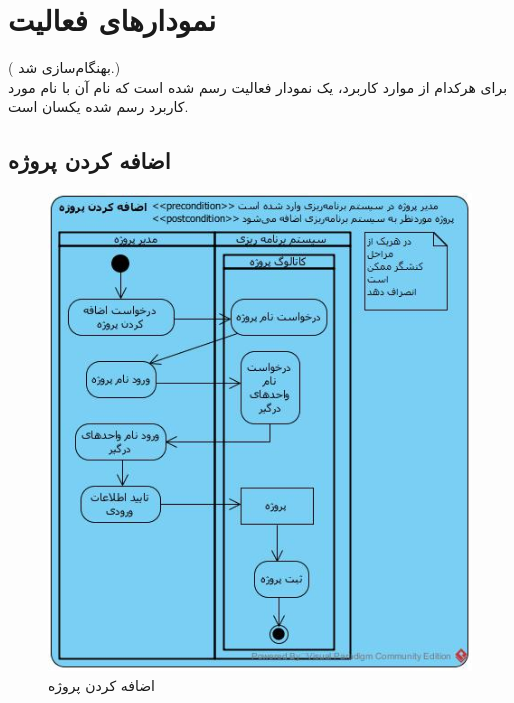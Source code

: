 \chapter{نمودارهای فعالیت}
({\color{red} بهنگام‌سازی شد.})
\\
برای هرکدام از موارد کاربرد، یک نمودار فعالیت رسم شده است که نام آن با نام مورد کاربرد رسم شده یکسان است.
\section{اضافه کردن پروژه}
\begin{figure}[H]
	\centering
	\includegraphics[scale=0.9]{img/activity/AddProjectToOrganization}
	\caption{اضافه کردن پروژه}
\end{figure}

